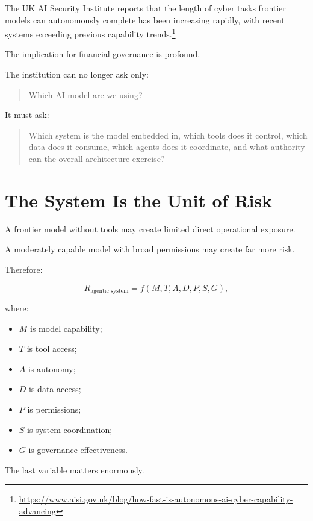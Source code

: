 The UK AI Security Institute reports that the length of cyber tasks frontier models can autonomously complete has been increasing rapidly, with recent systems exceeding previous capability trends.\footnote{\url{https://www.aisi.gov.uk/blog/how-fast-is-autonomous-ai-cyber-capability-advancing}}

The implication for financial governance is profound.

The institution can no longer ask only:

\begin{quote}
Which AI model are we using?
\end{quote}

It must ask:

\begin{quote}
Which system is the model embedded in, which tools does it control, which data does it consume, which agents does it coordinate, and what authority can the overall architecture exercise?
\end{quote}

\section{The System Is the Unit of Risk}

A frontier model without tools may create limited direct operational exposure.

A moderately capable model with broad permissions may create far more risk.

Therefore:

\begin{equation}
R_{\text{agentic system}}
=
f(
M,
T,
A,
D,
P,
S,
G
),
\end{equation}

where:

\begin{itemize}
    \item \(M\) is model capability;
    \item \(T\) is tool access;
    \item \(A\) is autonomy;
    \item \(D\) is data access;
    \item \(P\) is permissions;
    \item \(S\) is system coordination;
    \item \(G\) is governance effectiveness.
\end{itemize}

The last variable matters enormously.

